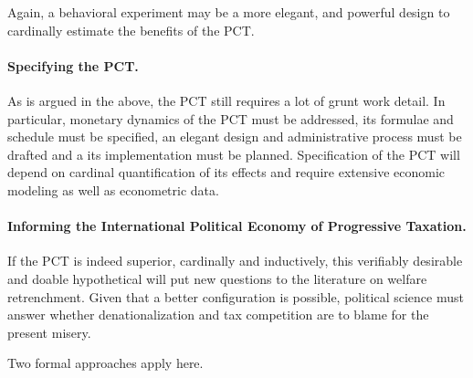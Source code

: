 Again, a behavioral experiment may be a more elegant, and powerful design to cardinally estimate the benefits of the PCT. 
	
\paragraph{Specifying the PCT.} As is argued in the above, the PCT still requires a lot of grunt work detail. In particular, monetary dynamics of the PCT must be addressed, its formulae and schedule must be specified, an elegant design and administrative process must be drafted and a its implementation must be planned. Specification of the PCT will depend on cardinal quantification of its effects and require extensive economic modeling as well as econometric data.

\paragraph{Informing the International Political Economy of Progressive Taxation.} If the PCT is indeed superior, cardinally and inductively, this verifiably desirable and doable hypothetical will put new questions to the literature on welfare retrenchment. Given that a better configuration is possible, political science must answer whether denationalization and tax competition are to blame for the present misery. 

Two formal approaches apply here.

